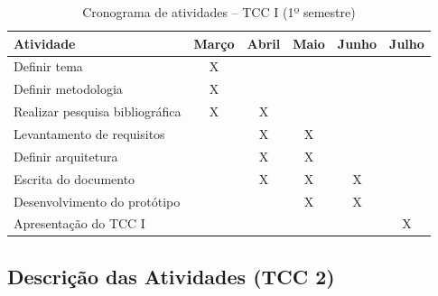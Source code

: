 \begin{table}[H]
\centering
\caption{Cronograma de atividades – TCC I (1º semestre)}
\label{tab:cronograma_tcc1}
\begin{tabular}{|p{6cm}|c|c|c|c|c|}
\hline
\textbf{Atividade} & \textbf{Março} & \textbf{Abril} & \textbf{Maio} & \textbf{Junho} & \textbf{Julho} \\
\hline
Definir tema                        & X &   &   &   &   \\
Definir metodologia                & X &   &   &   &   \\
Realizar pesquisa bibliográfica   & X & X &   &   &   \\
Levantamento de requisitos        &   & X & X &   &   \\
Definir arquitetura               &   & X & X &   &   \\
Escrita do documento              &   & X & X & X &   \\
Desenvolvimento do protótipo      &   &   & X & X &   \\
Apresentação do TCC I             &   &   &   &   & X \\
\hline
\end{tabular}
\end{table}


\subsection{Descrição das Atividades (TCC 2)}


